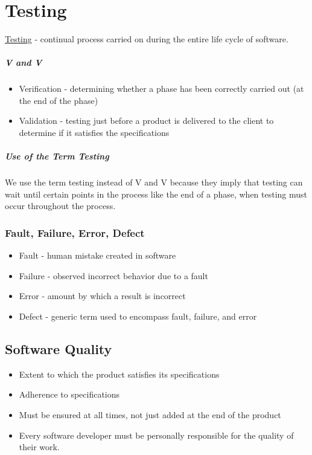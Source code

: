 \documentclass{report}
\begin{document}
	\chapter{Testing}
		\underline{Testing} - continual process carried on during the entire life cycle of software.\\
		\paragraph{V and V}
			\begin{itemize}
				\item Verification - determining whether a phase has been correctly carried out (at the end of the phase) 
				\item Validation - testing just before a product is delivered to the client to determine if it satisfies the specifications
			\end{itemize}
		\paragraph{Use of the Term Testing}
			We use the term testing instead of V and V because they imply that testing can wait until certain points in the process like the end of a phase, when testing must occur throughout the process.
			\subsection{Fault, Failure, Error, Defect}
				\begin{itemize}
					\item Fault - human mistake created in software
					\item Failure - observed incorrect behavior due to a fault
					\item Error - amount by which a result is incorrect 
					\item Defect - generic term used to encompass fault, failure, and error
				\end{itemize}
		\section{Software Quality}
			\begin{itemize}
				\item Extent to which the product satisfies its specifications
				\item Adherence to specifications
				\item Must be ensured at all times, not just added at the end of the product
				\item Every software developer must be personally responsible for the quality of their work.
			\end{itemize}
\end{document}
